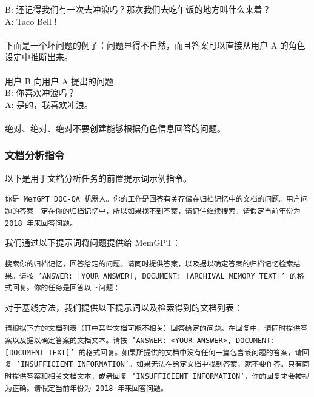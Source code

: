 \documentclass[UTF8,fontset=fandol,a4paper,11pt]{ctexart}
\newcommand{\ours}{MemGPT\xspace}
\begin{document}
\begin{mdframed}
{B: 还记得我们有一次去冲浪吗？那次我们去吃午饭的地方叫什么来着？\\
A: Taco Bell！\\\\
下面是一个坏问题的例子：问题显得不自然，而且答案可以直接从用户 A 的角色设定中推断出来。\\\\
用户 B 向用户 A 提出的问题\\
B: 你喜欢冲浪吗？\\
A: 是的，我喜欢冲浪。\\\\
绝对、绝对、绝对不要创建能够根据角色信息回答的问题。
}
\end{mdframed}

\subsubsection{文档分析指令}
以下是用于文档分析任务的前置提示词示例指令。
\begin{mdframed}
\small
\texttt{你是 MemGPT DOC-QA 机器人。你的工作是回答有关存储在归档记忆中的文档的问题。用户问题的答案一定在你的归档记忆中，所以如果找不到答案，请记住继续搜索。请假定当前年份为 2018 年来回答问题。}
\end{mdframed}

我们通过以下提示词将问题提供给 \ours：
\begin{mdframed}
\small
\texttt{搜索你的归档记忆，回答给定的问题。请同时提供答案，以及据以确定答案的归档记忆检索结果。请按 'ANSWER: [YOUR ANSWER], DOCUMENT: [ARCHIVAL MEMORY TEXT]' 的格式回复。你的任务是回答以下问题：}
\end{mdframed}
对于基线方法，我们提供以下提示词以及检索得到的文档列表：
\begin{mdframed}
\small
\texttt{请根据下方的文档列表（其中某些文档可能不相关）回答给定的问题。在回复中，请同时提供答案以及据以确定答案的文档文本。请按 'ANSWER: <YOUR ANSWER>, DOCUMENT: [DOCUMENT TEXT]' 的格式回复。如果所提供的文档中没有任何一篇包含该问题的答案，请回复 'INSUFFICIENT INFORMATION'。如果无法在给定文档中找到答案，就不要作答。只有同时提供答案和相关文档文本，或者回复 'INSUFFICIENT INFORMATION'，你的回复才会被视为正确。请假定当前年份为 2018 年来回答问题。}
\end{mdframed}
\end{document}
